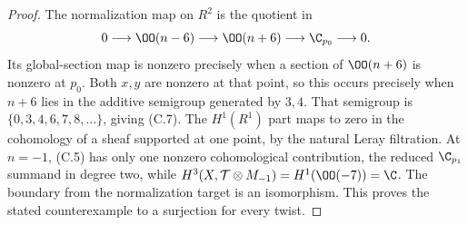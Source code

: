 \begin{proof}
The normalization map on $R^2$ is the quotient in
\[
0\longrightarrow\OO(n-6)\longrightarrow\OO(n+6)
 \longrightarrow\C_{p_0}\longrightarrow0.
\]
Its global-section map is nonzero precisely when a section of $\OO(n+6)$ is nonzero at $p_0$. Both $x,y$ are nonzero at that point, so this occurs precisely when $n+6$ lies in the additive semigroup generated by $3,4$. That semigroup is $\{0,3,4,6,7,8,\ldots\}$, giving (C.7). The $H^1(R^1)$ part maps to zero in the cohomology of a sheaf supported at one point, by the natural Leray filtration. At $n=-1$, (C.5) has only one nonzero cohomological contribution, the reduced $\C_{p_1}$ summand in degree two, while $H^3(X,\mathcal T\otimes M_{-1})=H^1(\OO(-7))=\C$. The boundary from the normalization target is an isomorphism. This proves the stated counterexample to a surjection for every twist.
\end{proof}



